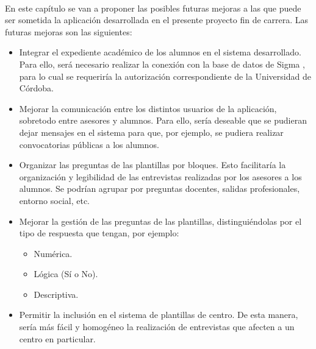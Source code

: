 \paragraph{}En este capítulo se van a proponer las posibles futuras mejoras
a las que puede ser sometida la aplicación desarrollada en el presente
proyecto fin de carrera. Las futuras mejoras son las siguientes:

\begin{itemize}
  \item Integrar el expediente académico de los alumnos en el sistema
  desarrollado. Para ello, será necesario realizar la conexión con la base de
  datos de Sigma \cite{sigma}, para lo cual se requeriría la autorización
  correspondiente de la Universidad de Córdoba.
  \item Mejorar la comunicación entre los distintos usuarios de la aplicación,
  sobretodo entre asesores y alumnos. Para ello, sería deseable que se pudieran
  dejar mensajes en el sistema para que, por ejemplo, se pudiera realizar
  convocatorias públicas a los alumnos.
  \item Organizar las preguntas de las plantillas por bloques. Esto facilitaría
  la organización y legibilidad de las entrevistas realizadas por los asesores
  a los alumnos. Se podrían agrupar por preguntas docentes, salidas
  profesionales, entorno social, etc.
  \item Mejorar la gestión de las preguntas de las plantillas, distinguiéndolas
  por el tipo de respuesta que tengan, por ejemplo:
  \begin{itemize}
    \item Numérica.
    \item Lógica (Sí o No).
    \item Descriptiva.
  \end{itemize}
  \item Permitir la inclusión en el sistema de plantillas de centro. De esta
  manera, sería más fácil y homogéneo la realización de entrevistas que afecten
  a un centro en particular.
\end{itemize}


